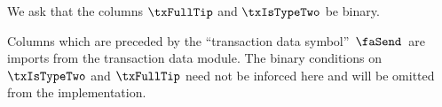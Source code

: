 We ask that the columns $\txFullTip$ and $\txIsTypeTwo$ be binary.

\saNote{} Columns which are preceded by the ``transaction data symbol'' $\transactionSignifier$ are imports from the transaction data module. The binary conditions on $\txIsTypeTwo$ and $\txFullTip$ need not be inforced here and will be omitted from the implementation.